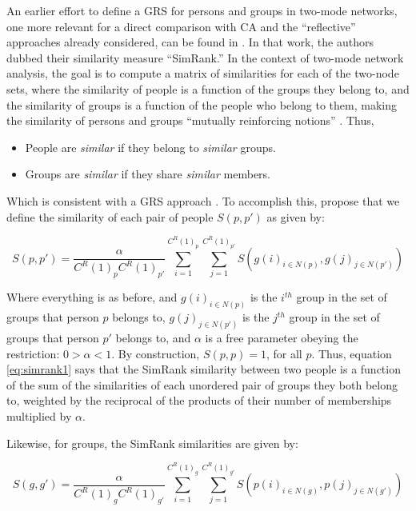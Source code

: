 \documentclass[a4paper,fleqn]{cas-sc}
\begin{document}
An earlier effort to define a GRS for persons and groups in two-mode networks, one more relevant for a direct comparison with CA and the ``reflective'' approaches already considered, can be found in \citet{jeh2002simrank}. In that work, the authors dubbed their similarity measure ``SimRank.'' In the context of two-mode network analysis, the goal is to compute a matrix of similarities for each of the two-node sets, where the similarity of people is a function of the groups they belong to, and the similarity of groups is a function of the people who belong to them, making the similarity of persons and groups ``mutually reinforcing notions'' \citep[540]{jeh2002simrank}. Thus,

\begin{itemize}
    \item People are \textit{similar} if they belong to \textit{similar} groups.
    \item Groups are \textit{similar} if they share \textit{similar} members.
\end{itemize}

Which is consistent with a GRS approach \citep[see][]{kovacs2010generalized, lizardo2024two}. To accomplish this, \citet[540, eq. 2 and eq. 3]{jeh2002simrank} propose that we define the similarity of each pair of people $S(p, p')$  as given by:

\begin{equation}
    S(p, p') = \frac{\alpha}{C^R(1)_pC^R(1)_{p'}}
    \sum_{i = 1}^{C^R(1)_p} \sum_{j = 1}^{C^R(1)_{p'}} 
    S\left(g(i)_{i \in N(p)}, g(j)_{j \in N(p')}\right)
    \label{eq:simrank1}
\end{equation}

Where everything is as before, and $g(i)_{i \in N(p)}$ is the $i^{th}$ group in the set of groups that person $p$ belongs to, $g(j)_{j \in N(p')}$ is the $j^{th}$ group in the set of groups that person $p'$ belongs to, and $\alpha$ is a free parameter obeying the restriction: $0 > \alpha < 1$. By construction, $S(p, p) = 1$, for all $p$. Thus, equation \ref{eq:simrank1} says that the SimRank similarity between two people is a function of the sum of the similarities of each unordered pair of groups they both belong to, weighted by the reciprocal of the products of their number of memberships multiplied by $\alpha$.

Likewise, for groups, the SimRank similarities are given by:

\begin{equation}
    S(g, g') = \frac{\alpha}{C^R(1)_gC^R(1)_{g'}}
    \sum_{i = 1}^{C^R(1)_g} \sum_{j = 1}^{C^R(1)_{g'}} 
    S\left(p(i)_{i \in N(g)}, p(j)_{j \in N(g')}\right)
    \label{eq:simrank2}
\end{equation}
\end{document}
